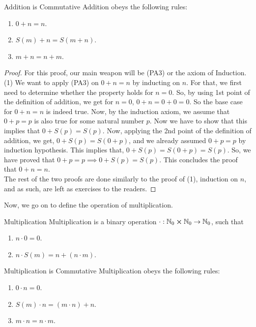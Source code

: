 \begin{Theorem}{Addition is Commutative}\label{addition_commutative}
	Addition obeys the following rules:
	\begin{enumerate}
		\item $0+n=n$.
		\item $S(m)+n=S(m+n)$.
		\item $m+n=n+m$.
	\end{enumerate}
\end{Theorem}
\begin{proof}
	For this proof, our main weapon will be (PA3) or the axiom of Induction.\\
	(1) We want to apply (PA3) on $0+n=n$ by inducting on $n$. For that, we first need to determine whether the property holds for $n=0$. So, by using 1st point of the definition of addition, we get for $n=0$, $0+n=0+0=0$. So the base case for $0+n=n$ is indeed true. Now, by the induction axiom, we assume that $0+p=p$ is also true for some natural number $p$. Now we have to show that this implies that $0+S(p)=S(p)$. Now, applying the 2nd point of the definition of addition, we get, $0+S(p)=S(0+p)$, and we already assumed $0+p=p$ by induction hypothesis. This implies that, $0+S(p)=S(0+p)=S(p)$. So, we have proved that $0+p=p\implies0+S(p)=S(p)$. This concludes the proof that $0+n=n$.\\
	The rest of the two proofs are done similarly to the proof of (1), induction on $n$, and as such, are left as exercises to the readers.
\end{proof}
\noindent Now, we go on to define the operation of multiplication.
\begin{Definition}{Multiplication}\label{multiplication}
	Multiplication is a binary operation  $\cdot:\mathbb{N}_0\cross\mathbb{N}_0\to\mathbb{N}_0$, such that
	\begin{enumerate}
		\item $n\cdot0=0$.
		\item $n\cdot S(m)=n+(n\cdot m)$.
	\end{enumerate}
\end{Definition}
\begin{Theorem}{Multiplication is Commutative}\label{multiplication_commutative}
	Multiplication obeys the following rules:
	\begin{enumerate}
		\item $0\cdot n=0$.
		\item $S(m)\cdot n=(m\cdot n)+n$.
		\item $m\cdot n=n\cdot m$.
	\end{enumerate}
\end{Theorem}
